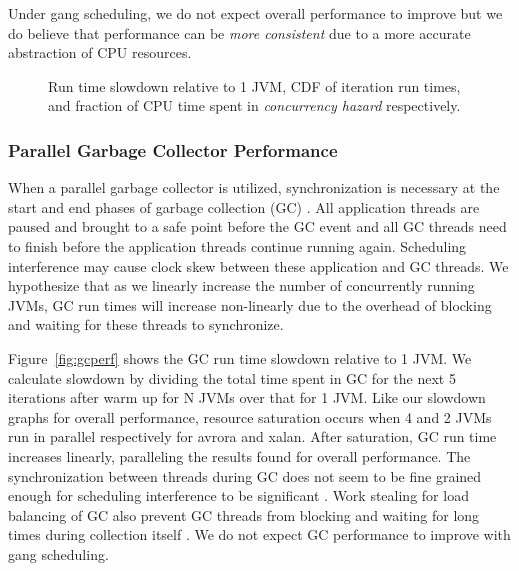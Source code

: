 \documentclass{sig-alternate}
\begin{document}
Under gang scheduling, we do not expect overall performance to improve but we do believe that performance can be \textit{more consistent} due to a more accurate abstraction of CPU resources.

\begin{figure*}
\centering
{}
\caption{Run time slowdown relative to 1 JVM, CDF of iteration run times, and fraction of CPU time spent in \textit{concurrency hazard} respectively.}
\label{fig:overallperf}
\end{figure*}

\subsubsection{Parallel Garbage Collector Performance}
When a parallel garbage collector is utilized, synchronization is necessary at the start and end phases of garbage collection (GC) \cite{hotspot:whitepaper}. All application threads are paused and brought to a safe point before the GC event and all GC threads need to finish before the application threads continue running again. Scheduling interference may cause clock skew between these application and GC threads. We hypothesize that as we linearly increase the number of concurrently running JVMs, GC run times will increase non-linearly due to the overhead of blocking and waiting for these threads to synchronize.

Figure~\ref{fig:gcperf} shows the GC run time slowdown relative to 1 JVM. We calculate slowdown by dividing the total time spent in GC for the next 5 iterations after warm up for N JVMs over that for 1 JVM. Like our slowdown graphs for overall performance, resource saturation occurs when 4 and 2 JVMs run in parallel respectively for avrora and xalan. After saturation, GC run time increases linearly, paralleling the results found for overall performance. The synchronization between threads during GC does not seem to be fine grained enough for scheduling interference to be significant \cite{feitelson1992gang}. Work stealing for load balancing of GC also prevent GC threads from blocking and waiting for long times during collection itself \cite{stoptheworldgc}. We do not expect GC performance to improve with gang scheduling.
\end{document}
